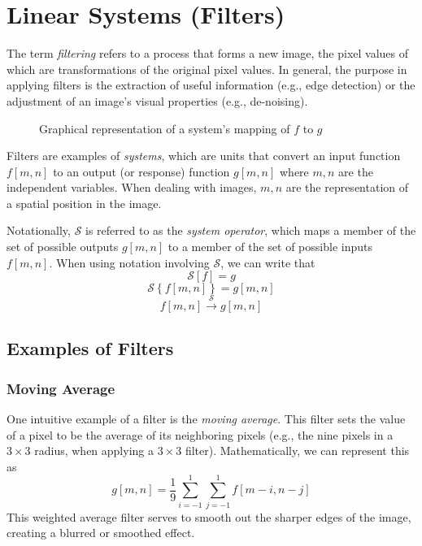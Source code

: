 \documentclass{article}
\begin{document}
\section{Linear Systems (Filters)}

The term \emph{filtering} refers to a process that forms a new image, the pixel values of which are transformations of the original pixel values. In general, the purpose in applying filters is the extraction of useful information (e.g., edge detection) or the adjustment of an image's visual properties (e.g., de-noising).

\begin{figure}
\begin{center}
\end{center}
\caption{Graphical representation of a system's mapping of $f$ to $g$}
\end{figure}

Filters are examples of \emph{systems}, which are units that convert an input function $f[m, n]$ to an output (or response) function $g[m, n]$ where $m, n$ are the independent variables. When dealing with images, $m, n$ are the representation of a spatial position in the image.

Notationally, $\mathcal{S}$ is referred to as the \emph{system operator}, which maps a member of the set of possible outputs $g[m, n]$ to a member of the set of possible inputs $f[m, n]$. When using notation involving $\mathcal{S}$, we can write that
\[
\mathcal{S}[f] = g
\]
\[
	\mathcal{S}\left\{f[m, n]\right\} = g[m, n]
\]
\[
	f[m, n] \xrightarrow{\mathcal{S}} g[m, n]
\]

\subsection{Examples of Filters}

\subsubsection*{Moving Average}
One intuitive example of a filter is the \emph{moving average}. This filter sets the value of a pixel to be the average of its neighboring pixels (e.g., the nine pixels in a $3 \times 3$ radius, when applying a $3 \times 3$ filter). Mathematically, we can represent this as
\[
	g[m, n] = \frac{1}{9} \sum\limits_{i = -1}^{1}\sum\limits_{j = -1}^{1} f[m - i, n - j] \tag{Weighted Average}
\]
This weighted average filter serves to smooth out the sharper edges of the image, creating a blurred or smoothed effect.
\end{document}
